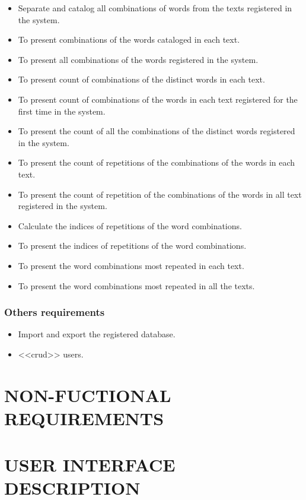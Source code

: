 \documentclass[11pt, twoside, a4paper]{book}
\begin{document}
				\begin{itemize}
					\item Separate and catalog all combinations of words from the texts registered in the system.

					\item To present combinations of the words cataloged in each text.
					\item To present all combinations of the words registered in the system.
				
					\item To present count of combinations of the distinct words in each text.
					\item To present count of combinations of the words in each text registered for the first time in the system.
					\item To present the count of all the combinations of the distinct words registered in the system.
				
					\item To present the count of repetitions of the combinations of the words in each text.
					\item To present the count of repetition of the combinations of the words in all text registered in the system.

					\item Calculate the indices of repetitions of the word combinations.
					\item To present the indices of repetitions of the word combinations.
				
					\item To present the word combinations most repeated in each text.
					\item To present the word combinations most repeated in all the texts.
				\end{itemize}

			\subsection{Others requirements}

				\begin{itemize}
					\item Import and export the registered database.
					\item <<crud>> users.			
				\end{itemize}
		
	\chapter{NON-FUCTIONAL REQUIREMENTS}
	
	\chapter{USER INTERFACE DESCRIPTION}
\end{document}
